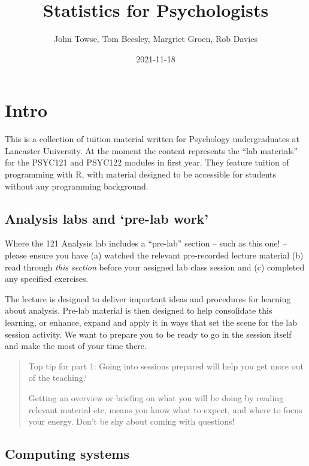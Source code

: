 \documentclass[
]{book}
\title{Statistics for Psychologists}
\author{John Towse, Tom Beesley, Margriet Groen, Rob Davies}
\date{2021-11-18}
\begin{document}
\maketitle

{
\setcounter{tocdepth}{1}
\tableofcontents
}
\hypertarget{intro}{%
\chapter{Intro}\label{intro}}

This is a collection of tuition material written for Psychology undergraduates at Lancaster University. At the moment the content represents the ``lab materials'' for the PSYC121 and PSYC122 modules in first year. They feature tuition of programming with R, with material designed to be accessible for students without any programming background.

\hypertarget{analysis-labs-and-pre-lab-work}{%
\section{Analysis labs and `pre-lab work'}\label{analysis-labs-and-pre-lab-work}}

Where the 121 Analysis lab includes a ``pre-lab'' section -- such as this one! -- please ensure you have (a) watched the relevant pre-recorded lecture material (b) read through \emph{this section} before your assigned lab class session and (c) completed any specified exercises.

The lecture is designed to deliver important ideas and procedures for learning about analysis. Pre-lab material is then designed to help consolidate this learning, or enhance, expand and apply it in ways that set the scene for the lab session activity. We want to prepare you to be ready to go in the session itself and make the most of your time there.

\begin{quote}
Top tip for part 1: Going into sessions prepared will help you get more out of the teaching.`

Getting an overview or briefing on what you will be doing by reading relevant material etc, means you know what to expect, and where to focus your energy. Don't be shy about coming with questions!
\end{quote}

\hypertarget{computing-systems}{%
\section{Computing systems}\label{computing-systems}}
\end{document}
